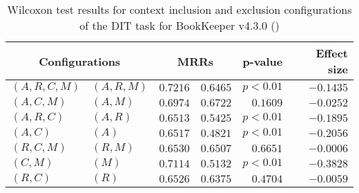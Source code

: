 
\begin{table}
\begin{spacing}{1.2}
\centering
\caption{Wilcoxon test results for context inclusion and exclusion configurations of the DIT task for BookKeeper v4.3.0 (\ctwo)}
\label{table:versus-wilcox-bookkeeper-dit-context}
\begin{tabular}{ll|rr|rr}
\toprule
      \multicolumn{2}{c|}{Configurations} &                \multicolumn{2}{c|}{MRRs} &        p-value & Effect size \\
\midrule
 $(A,R,C,M)$ &  $(A,R,M)$ &  $\bm{0.7216}$ &  $0.6465$ & $p<0.01$ &   $-0.1435$ \\
   $(A,C,M)$ &    $(A,M)$ &  $\bm{0.6974}$ &  $0.6722$ & $0.1609$ &   $-0.0252$ \\
   $(A,R,C)$ &    $(A,R)$ &  $\bm{0.6513}$ &  $0.5425$ & $p<0.01$ &   $-0.1895$ \\
     $(A,C)$ &      $(A)$ &  $\bm{0.6517}$ &  $0.4821$ & $p<0.01$ &   $-0.2056$ \\
   $(R,C,M)$ &    $(R,M)$ &  $\bm{0.6530}$ &  $0.6507$ & $0.6651$ &   $-0.0006$ \\
     $(C,M)$ &      $(M)$ &  $\bm{0.7114}$ &  $0.5132$ & $p<0.01$ &   $-0.3828$ \\
     $(R,C)$ &      $(R)$ &  $\bm{0.6526}$ &  $0.6375$ & $0.4704$ &   $-0.0059$ \\
\bottomrule
\end{tabular}

\end{spacing}
\end{table}

